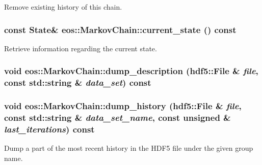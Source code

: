 Remove existing history of this chain. \hypertarget{classeos_1_1MarkovChain_a4ba66e0d64dade9f392d2542a7c566f4}{
\subsubsection[{current\_\-state}]{\setlength{\rightskip}{0pt plus 5cm}const {\bf State}\& eos::MarkovChain::current\_\-state () const}}
\label{classeos_1_1MarkovChain_a4ba66e0d64dade9f392d2542a7c566f4}


Retrieve information regarding the current state. \hypertarget{classeos_1_1MarkovChain_af528eb210dd7052ceeb9455cb588cdd4}{
\subsubsection[{dump\_\-description}]{\setlength{\rightskip}{0pt plus 5cm}void eos::MarkovChain::dump\_\-description ({\bf hdf5::File} \& {\em file}, \/  const std::string \& {\em data\_\-set}) const}}
\label{classeos_1_1MarkovChain_af528eb210dd7052ceeb9455cb588cdd4}
\hypertarget{classeos_1_1MarkovChain_aa7fc24a3066077ab60de68a5a3f8ebe5}{
\subsubsection[{dump\_\-history}]{\setlength{\rightskip}{0pt plus 5cm}void eos::MarkovChain::dump\_\-history ({\bf hdf5::File} \& {\em file}, \/  const std::string \& {\em data\_\-set\_\-name}, \/  const unsigned \& {\em last\_\-iterations}) const}}
\label{classeos_1_1MarkovChain_aa7fc24a3066077ab60de68a5a3f8ebe5}
Dump a part of the most recent history in the HDF5 file under the given group name.


